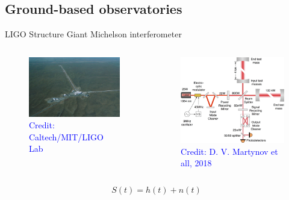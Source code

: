 \documentclass[pdf]{beamer}
\newcommand{\credit}[1]{\tiny{\textcolor{blue}{Credit: #1}}}
\begin{document}
\subsection{Ground-based observatories}
\begin{frame}{LIGO Structure}
Giant Michelson interferometer
\begin{columns}
\begin{figure}
\includegraphics[scale=.6]{fig/HiResHanford_5.jpg}
\caption*{\credit{Caltech/MIT/LIGO Lab}}
\end{figure}
\begin{figure}
\includegraphics[scale=.14]{fig/IFO_SCHEME.png}
\caption*{\credit{D. V. Martynov et all, 2018}}
\end{figure}
\end{columns}
\begin{equation*}
S(t) = h(t) + n(t)
\end{equation*}
\end{frame}
\end{document}
